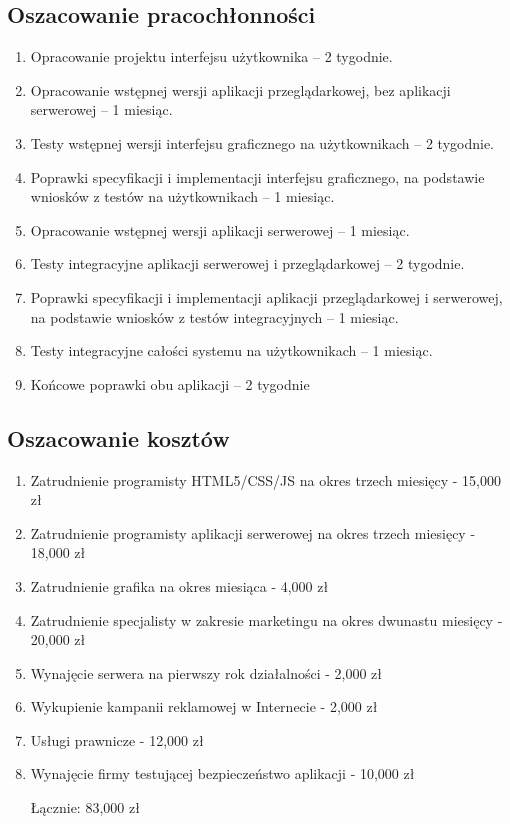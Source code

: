 \documentclass[12pt,a4paper]{report}
\begin{document}
\subsection{Oszacowanie pracochłonności}
\begin{enumerate}
	\item Opracowanie projektu interfejsu użytkownika -- 2 tygodnie.
	\item Opracowanie wstępnej wersji aplikacji przeglądarkowej, bez aplikacji serwerowej -- 1 miesiąc.
	\item Testy wstępnej wersji interfejsu graficznego na użytkownikach -- 2 tygodnie.
	\item Poprawki specyfikacji i implementacji interfejsu graficznego, na podstawie wniosków z testów na użytkownikach -- 1 miesiąc.
	\item Opracowanie wstępnej wersji aplikacji serwerowej -- 1 miesiąc.
	\item Testy integracyjne aplikacji serwerowej i przeglądarkowej -- 2 tygodnie.
	\item Poprawki specyfikacji i implementacji aplikacji przeglądarkowej i serwerowej, na podstawie wniosków z testów integracyjnych -- 1 miesiąc.
	\item Testy integracyjne całości systemu na użytkownikach -- 1 miesiąc.
	\item Końcowe poprawki obu aplikacji -- 2 tygodnie 
\end{enumerate}
\subsection{Oszacowanie kosztów}
\begin{enumerate}
	\item Zatrudnienie programisty HTML5/CSS/JS na okres trzech miesięcy - 15,000 zł
	\item Zatrudnienie programisty aplikacji serwerowej na okres trzech miesięcy - 18,000 zł
	\item Zatrudnienie grafika na okres miesiąca - 4,000 zł
	\item Zatrudnienie specjalisty w zakresie marketingu na okres dwunastu miesięcy - 20,000 zł
	\item Wynajęcie serwera na pierwszy rok działalności - 2,000 zł
	\item Wykupienie kampanii reklamowej w Internecie - 2,000 zł
	\item Usługi prawnicze - 12,000 zł
	\item Wynajęcie firmy testującej bezpieczeństwo aplikacji - 10,000 zł

Łącznie: 83,000 zł
\end{enumerate}
\newpage
\end{document}
